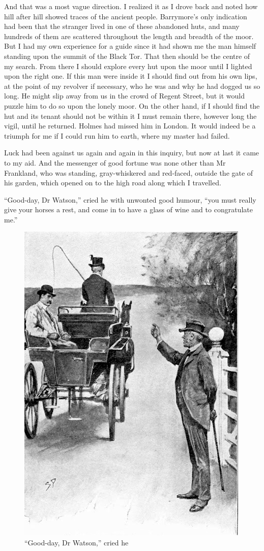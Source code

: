 \documentclass[paper=5.5in:8.5in,BCOR=7mm,twoside,DIV=calc,12pt,usegeometry,openany,chapterprefix,endperiod,headings=big]{scrbook} %
\begin{document}
And that was a most vague direction. I realized it as I drove back and noted how hill after hill showed traces of the ancient people. Barrymore's only indication had been that the stranger lived in one of these abandoned huts, and many hundreds of them are scattered throughout the length and breadth of the moor. But I had my own experience for a guide since it had shown me the man himself standing upon the summit of the Black Tor. That then should be the centre of my search. From there I should explore every hut upon the moor until I lighted upon the right one. If this man were inside it I should find out from his own lips, at the point of my revolver if necessary, who he was and why he had dogged us so long. He might slip away from us in the crowd of Regent Street, but it would puzzle him to do so upon the lonely moor. On the other hand, if I should find the hut and its tenant should not be within it I must remain there, however long the vigil, until he returned. Holmes had missed him in London. It would indeed be a triumph for me if I could run him to earth, where my master had failed.

Luck had been against us again and again in this inquiry, but now at last it came to my aid. And the messenger of good fortune was none other than Mr Frankland, who was standing, gray-whiskered and red-faced, outside the gate of his garden, which opened on to the high road along which I travelled.

\enquote{Good-day, Dr Watson,} cried he with unwonted good hum\-our, \enquote{you must really give your horses a rest, and come in to have a glass of wine and to congratulate me.}

\begin{figure}
\centering
\includegraphics[width=.6\linewidth]{11_goodday}
\caption{\enquote{Good-day, Dr Watson,} cried he}
\end{figure}
\end{document}
